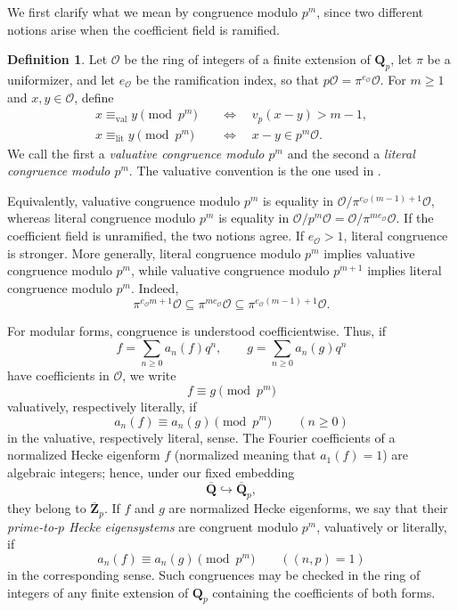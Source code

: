 \documentclass[11pt]{article}
\newcommand{\Q}{\mathbf Q}
\newcommand{\cO}{\mathcal O}
\theoremstyle{plain}
\theoremstyle{definition}
\newtheorem{definition}[theorem]{Definition}
\theoremstyle{remark}
\numberwithin{equation}{section}
\begin{document}
We first clarify what we mean by congruence modulo \(p^m\), since two different notions arise when the coefficient field is ramified. 

\begin{definition} \label{def:conventions} Let \(\cO\) be the ring of integers of a finite extension of \(\Q_p\), let \(\pi\) be a uniformizer, and let \(e_{\cO}\) be the ramification index, so that \( p\cO=\pi^{e_{\cO}}\cO. \) For \(m\geq1\) and \(x,y\in\cO\), define \[ \begin{aligned} x\equiv_{\mathrm{val}} y\pmod{p^m} &\quad\Longleftrightarrow\quad v_p(x-y)>m-1,\\ x\equiv_{\mathrm{lit}} y\pmod{p^m} &\quad\Longleftrightarrow\quad x-y\in p^m\cO. \end{aligned} \] We call the first a \emph{valuative congruence modulo \(p^m\)} and the second a \emph{literal congruence modulo \(p^m\)}. The valuative convention is the one used in \cite[\S1.1, pp.~479--480]{KRW2016}. 
\end{definition} 

Equivalently, valuative congruence modulo \(p^m\) is equality in \(\cO/\pi^{e_{\cO}(m-1)+1}\cO, \) whereas literal congruence modulo \(p^m\) is equality in \( \cO/p^m\cO = \cO/\pi^{me_{\cO}}\cO. \) If the coefficient field is unramified, the two notions agree. If \(e_{\cO}>1\), literal congruence is stronger. More generally, literal congruence modulo \(p^m\) implies valuative congruence modulo \(p^m\), while valuative congruence modulo \(p^{m+1}\) implies literal congruence modulo \(p^m\). Indeed, \[ \pi^{e_{\cO}m+1}\cO \subseteq \pi^{me_{\cO}}\cO \subseteq \pi^{e_{\cO}(m-1)+1}\cO. \]

For modular forms, congruence is understood coefficientwise. Thus, if \[ f=\sum_{n\geq0}a_n(f)q^n, \qquad g=\sum_{n\geq0}a_n(g)q^n \] have coefficients in \(\cO\), we write \[ f\equiv g\pmod{p^m} \] valuatively, respectively literally, if \[ a_n(f)\equiv a_n(g)\pmod{p^m} \qquad(n\geq0) \] in the valuative, respectively literal, sense. The Fourier coefficients of a normalized Hecke eigenform \(f\) (normalized meaning that \(a_1(f)=1\)) are algebraic integers; hence, under our fixed embedding \[ \overline{\mathbf Q}\hookrightarrow\overline{\mathbf Q}_p, \] they belong to \(\overline{\mathbf Z}_p\). If \(f\) and \(g\) are normalized Hecke eigenforms, we say that their \emph{prime-to-\(p\) Hecke eigensystems} are congruent modulo \(p^m\), valuatively or literally, if \[ a_n(f)\equiv a_n(g)\pmod{p^m} \qquad((n,p)=1) \] in the corresponding sense. Such congruences may be checked in the ring of integers of any finite extension of \(\mathbf Q_p\) containing the coefficients of both forms.
\end{document}
